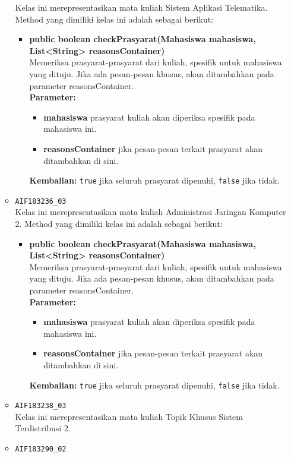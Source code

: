 \begin{enumerate}
\begin{itemize}
		Kelas ini merepresentasikan mata kuliah Sistem Aplikasi Telematika. Method yang dimiliki kelas ini adalah sebagai berikut: 
		\begin{itemize}
			\item \textbf{public boolean checkPrasyarat(Mahasiswa mahasiswa, List<String> reasonsContainer)}\\
			Memeriksa prasyarat-prasyarat dari kuliah, spesifik untuk mahasiswa yang dituju. Jika ada pesan-pesan khusus, akan ditambahkan pada parameter reasonsContainer.\\
			\textbf{Parameter:}
			\begin{itemize}
				\item \textbf{mahasiswa} prasyarat kuliah akan diperiksa spesifik pada mahasiswa ini.
				\item \textbf{reasonsContainer} jika pesan-pesan terkait prasyarat akan ditambahkan di sini.
			\end{itemize}
			\textbf{Kembalian:} \texttt{true} jika seluruh prasyarat dipenuhi, \texttt{false} jika tidak.
		\end{itemize}
		\item \texttt{AIF183236\_03} \\
		Kelas ini merepresentasikan mata kuliah Administrasi Jaringan Komputer 2. Method yang dimiliki kelas ini adalah sebagai berikut: 
		\begin{itemize}
			\item \textbf{public boolean checkPrasyarat(Mahasiswa mahasiswa, List<String> reasonsContainer)}\\
			Memeriksa prasyarat-prasyarat dari kuliah, spesifik untuk mahasiswa yang dituju. Jika ada pesan-pesan khusus, akan ditambahkan pada parameter reasonsContainer.\\
			\textbf{Parameter:}
			\begin{itemize}
				\item \textbf{mahasiswa} prasyarat kuliah akan diperiksa spesifik pada mahasiswa ini.
				\item \textbf{reasonsContainer} jika pesan-pesan terkait prasyarat akan ditambahkan di sini.
			\end{itemize}
			\textbf{Kembalian:} \texttt{true} jika seluruh prasyarat dipenuhi, \texttt{false} jika tidak.
		\end{itemize}
		\item \texttt{AIF183238\_03} \\
		Kelas ini merepresentasikan mata kuliah Topik Khusus Sistem Terdistribusi 2.
		\item \texttt{AIF183290\_02} \\

\end{itemize}
\end{enumerate}
